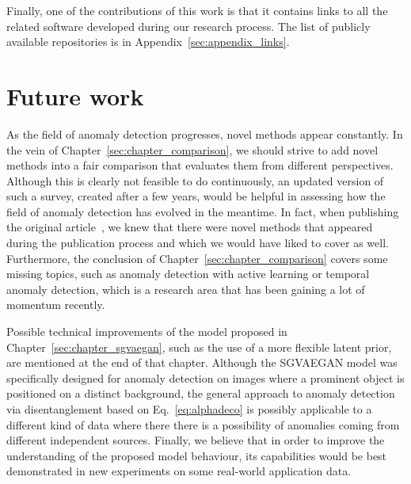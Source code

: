 Finally, one of the contributions of this work is that it contains links to all the related software developed during our research process. The list of publicly available repositories is in Appendix~\ref{sec:appendix_links}.

\section{Future work}
As the field of anomaly detection progresses, novel methods appear constantly. In the vein of Chapter~\ref{sec:chapter_comparison}, we should strive to add novel methods into a fair comparison that evaluates them from different perspectives. Although this is clearly not feasible to do continuously, an updated version of such a survey, created after a few years, would be helpful in assessing how the field of anomaly detection has evolved in the meantime. In fact, when publishing the original article~\cite{vskvara2021comparison}, we knew that there were novel methods that appeared during the publication process and which we would have liked to cover as well. Furthermore, the conclusion of Chapter~\ref{sec:chapter_comparison} covers some missing topics, such as anomaly detection with active learning or temporal anomaly detection, which is a research area that has been gaining a lot of momentum recently.

Possible technical improvements of the model proposed in Chapter~\ref{sec:chapter_sgvaegan}, such as the use of a more flexible latent prior, are mentioned at the end of that chapter. Although the SGVAEGAN model was specifically designed for anomaly detection on images where a prominent object is positioned on a distinct background, the general approach to anomaly detection via disentanglement based on Eq.~\eqref{eq:alphadeco} is possibly applicable to a different kind of data where there there is a possibility of anomalies coming from different independent sources. Finally, we believe that in order to improve the understanding of the proposed model behaviour, its capabilities would be best demonstrated in new experiments on some real-world application data.
